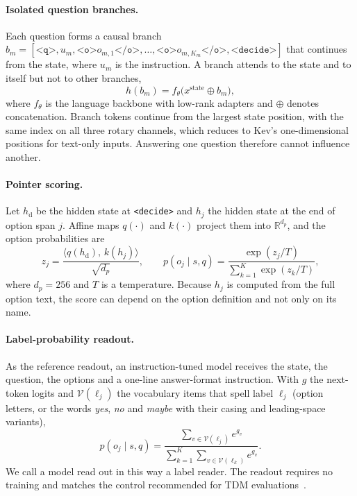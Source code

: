 \documentclass{article}
\begin{document}
\paragraph{Isolated question branches.} Each question forms a causal branch $b_m = [\texttt{<q>}, u_m, \texttt{<o>} o_{m,1} \texttt{</o>}, \dots, \texttt{<o>} o_{m,K_m} \texttt{</o>}, \texttt{<decide>}]$ that continues from the state, where $u_m$ is the instruction. A branch attends to the state and to itself but not to other branches,
\begin{equation}
  h(b_m) = f_\theta\big(x^{\mathrm{state}} \oplus b_m\big),
  \label{eq:branch}
\end{equation}
where $f_\theta$ is the language backbone with low-rank adapters and $\oplus$ denotes concatenation. Branch tokens continue from the largest state position, with the same index on all three rotary channels, which reduces to Kev's one-dimensional positions for text-only inputs. Answering one question therefore cannot influence another.

\paragraph{Pointer scoring.} Let $h_{\mathrm{d}}$ be the hidden state at \texttt{<decide>} and $h_j$ the hidden state at the end of option span $j$. Affine maps $q(\cdot)$ and $k(\cdot)$ project them into $\mathbb{R}^{d_p}$, and the option probabilities are
\begin{equation}
  z_j = \frac{\langle q(h_{\mathrm{d}}),\, k(h_j)\rangle}{\sqrt{d_p}}, \qquad p(o_j\mid s,q) = \frac{\exp(z_j/T)}{\sum_{k=1}^{K}\exp(z_k/T)},
  \label{eq:typed}
\end{equation}
where $d_p=256$ and $T$ is a temperature. Because $h_j$ is computed from the full option text, the score can depend on the option definition and not only on its name.

\paragraph{Label-probability readout.} As the reference readout, an instruction-tuned model receives the state, the question, the options and a one-line answer-format instruction. With $g$ the next-token logits and $\mathcal{V}(\ell_j)$ the vocabulary items that spell label $\ell_j$ (option letters, or the words \emph{yes}, \emph{no} and \emph{maybe} with their casing and leading-space variants),
\begin{equation}
  p(o_j\mid s,q) = \frac{\sum_{v\in\mathcal{V}(\ell_j)} e^{g_v}}{\sum_{k=1}^{K}\sum_{v\in\mathcal{V}(\ell_k)} e^{g_v}}.
  \label{eq:label}
\end{equation}
We call a model read out in this way a label reader. The readout requires no training and matches the control recommended for TDM evaluations~\citep{audit2026tdm}.
\end{document}
